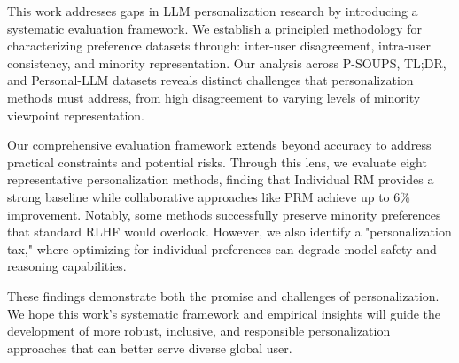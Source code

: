 This work addresses gaps in LLM personalization research by introducing a systematic evaluation framework. We establish a principled methodology for characterizing preference datasets through: inter-user disagreement, intra-user consistency, and minority representation. Our analysis across P-SOUPS, TL;DR, and Personal-LLM datasets reveals distinct challenges that personalization methods must address, from high disagreement to varying levels of minority viewpoint representation.

Our comprehensive evaluation framework extends beyond accuracy to address practical constraints and potential risks. Through this lens, we evaluate eight representative personalization methods, finding that Individual RM provides a strong baseline while collaborative approaches like PRM achieve up to 6\% improvement. Notably, some methods successfully preserve minority preferences that standard RLHF would overlook. However, we also identify a "personalization tax," where optimizing for individual preferences can degrade model safety and reasoning capabilities.

These findings demonstrate both the promise and challenges of personalization. We hope this work's systematic framework and empirical insights will guide the development of more robust, inclusive, and responsible personalization approaches that can better serve diverse global user. 






